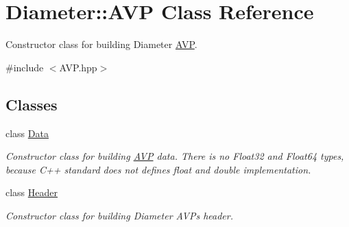 \hypertarget{classDiameter_1_1AVP}{}\section{Diameter\+:\+:A\+VP Class Reference}
\label{classDiameter_1_1AVP}


Constructor class for building Diameter \hyperlink{classDiameter_1_1AVP}{A\+VP}.  




{\ttfamily \#include $<$A\+V\+P.\+hpp$>$}

\subsection*{Classes}
\begin{DoxyCompactItemize}
\item 
class \hyperlink{classDiameter_1_1AVP_1_1Data}{Data}
\begin{DoxyCompactList}\small\item\em Constructor class for building \hyperlink{classDiameter_1_1AVP}{A\+VP} data. There is no Float32 and Float64 types, because C++ standard does not defines {\ttfamily float} and {\ttfamily double} implementation. \end{DoxyCompactList}\item 
class \hyperlink{classDiameter_1_1AVP_1_1Header}{Header}
\begin{DoxyCompactList}\small\item\em Constructor class for building Diameter A\+V\+Ps header. \end{DoxyCompactList}\end{DoxyCompactItemize}
